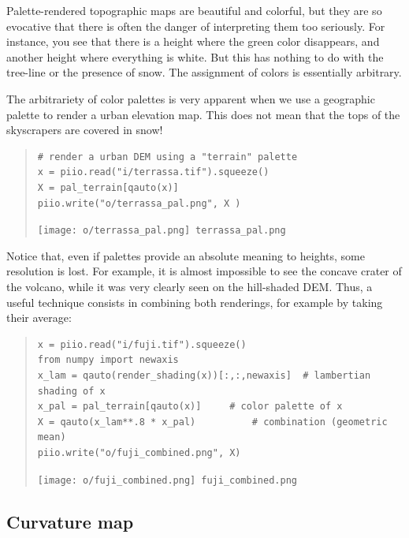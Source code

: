 Palette-rendered topographic maps are beautiful and colorful, but they are so
evocative that there is often the danger of interpreting them too seriously.
For instance, you see that there is a height where the green color
disappears, and another height where everything is white.  But this has
nothing to do with the tree-line or the presence of snow.  The assignment of
colors is essentially arbitrary.


\begin{samepage}
The arbitrariety of color palettes is very apparent when we use a
geographic palette to render a urban elevation map.  This does not mean that
the tops of the skyscrapers are covered in snow!

\begin{quote}
\begin{verbatim}
# render a urban DEM using a "terrain" palette
x = piio.read("i/terrassa.tif").squeeze()
X = pal_terrain[qauto(x)]
piio.write("o/terrassa_pal.png", X )
\end{verbatim}
\texttt{[image: o/terrassa\_pal.png]}~\verb+terrassa_pal.png+
\end{quote}
\end{samepage}


Notice that, even if palettes provide an absolute meaning to heights, some
resolution is lost.  For example, it is almost impossible to see the concave
crater of the volcano, while it was very clearly seen on the hill-shaded DEM.
Thus, a useful technique consists in combining both renderings, for example
by taking their average:

\begin{quote}
\begin{verbatim}
x = piio.read("i/fuji.tif").squeeze()
from numpy import newaxis
x_lam = qauto(render_shading(x))[:,:,newaxis]  # lambertian shading of x
x_pal = pal_terrain[qauto(x)]     # color palette of x
X = qauto(x_lam**.8 * x_pal)          # combination (geometric mean)
piio.write("o/fuji_combined.png", X)
\end{verbatim}
\texttt{[image: o/fuji\_combined.png]}~\verb+fuji_combined.png+
\end{quote}



%
%

\clearpage
\subsection{Curvature map}


